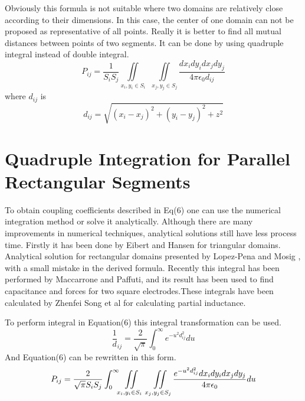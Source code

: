 \documentclass[final,5p,times,twocolumn]{elsarticle}
\begin{document}
Obviously this formula is not suitable where two domains are relatively close according to their dimensions. In this case, the center of one domain can not be proposed as representative of all points. Really it is better to find all mutual distances between points of two segments. It can be done by using quadruple integral instead of double integral.
\begin{equation}
\label {eq6}
P_{ij} = \frac 1 {S_i S_j}\iint\limits_{x_i, y_i \in S_i}\ \  \iint\limits_{x_j, y_j \in S_j}  \frac{dx_i dy_i dx_j dy_j}{4 \pi \epsilon_0 d_{ij}}
\end{equation} 
where $d _{ij}$ is 
\begin{equation}
\label {eq7}
d_{ij} = \sqrt{(x_i-x_j)^2 + (y_i-y_j)^2 + z^2}
\end{equation} 
\section{Quadruple Integration for Parallel Rectangular Segments}
To obtain coupling coefficients described in Eq(6) one can use the numerical integration method or solve it analytically. Although there are many improvements in numerical techniques, analytical solutions still have less process time. Firstly it has been done by Eibert and Hansen for triangular domains\cite{Eibert1995}. Analytical solution for rectangular domains presented by Lopez-Pena and Mosig \cite{Lopez2009}, with a small mistake in the derived formula. Recently this integral has been performed by Maccarrone and Paffuti\cite{Maccarrone2017}, and its result has been used to find capacitance and forces for two square electrodes.These integrals have been calculated by Zhenfei Song et al \cite{Song2011} for calculating partial inductance.

To perform integral in Equation(6) this integral transformation can be used\cite{Ciftja2010}.
\begin{equation}\label {eq8}
\frac 1 d_{ij} = \frac{2}{\sqrt{\pi}}\int_0^{\infty} e^{-u^2 d_{ij}^2 }du
\end{equation}
And Equation(6) can be rewritten in this form.
\begin{equation}
\label {eq9}
P_{ij} = \frac 2 {\sqrt{\pi} S_i S_j}\int_0^{\infty}\iint\limits_{x_i, y_i \in S_i}\ \  \iint\limits_{x_j, y_j \in S_j} \\ \frac{e^{-u^2 d_{ij}^2 } dx_i dy_i dx_j dy_j}{4 \pi \epsilon_0 } du
\end{equation}
\end{document}

